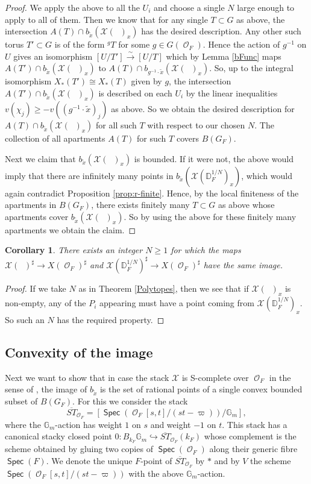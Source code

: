 \documentclass{article}
\DeclareMathOperator{\CO}{\mathcal{O}}
\def\isoto{\stackrel{\sim}{\longrightarrow}}
\DeclareMathOperator{\Spec}{\mathsf{Spec}}
\newcommand{\BG}{{\mathbb{G}}}
\newcommand{\CX}{{\mathcal X}}
\newcommand{\Dr}[1][r]{\mathbb{D}_F^{1/#1}}
\DeclareMathOperator{\Dinfty}{\mathbb{D}_F^{1/\infty}}
\let\into\hookrightarrow
\theoremstyle{definition}
\theoremstyle{plain}
\newtheorem{corollary}[definition]{Corollary}
\begin{document}
\begin{proof}
    We apply the above to all the $U_i$ and choose a single $N$ large enough to apply to all of them. Then we know that for any single $T \subset G$ as above, the intersection $A(T) \cap b_{\tilde x}(\CX(\Dinfty)_x)$ has the desired description. Any other such torus $T' \subset G$ is of the form $^{g}T$ for some $g \in G(\CO_F)$. Hence the action of $g^{-1}$ on $U$ gives an isomorphism $[U/T'] \isoto [U/T]$ which by Lemma \ref{bFunc} maps $A(T') \cap b_{\tilde x}(\CX(\Dinfty)_x)$ to $A(T) \cap b_{g^{-1}\cdot \tilde x}(\CX(\Dinfty)_x)$. So, up to the integral isomorphism $X_*(T') \cong X_*(T)$ given by $g$, the intersection $A(T') \cap b_{\tilde x}(\CX(\Dinfty)_x)$ is described on each $U_i$ by the linear inequalities $v(\chi_j) \geq -v((g^{-1}\cdot \tilde x)_j)$ as above. So we obtain the desired description for $A(T) \cap b_{\tilde x}(\CX(\Dinfty)_x)$ for all such $T$ with respect to our chosen $N$. The collection of all apartments $A(T)$ for such $T$ covers $B(G_F)$. 

    Next we claim that $b_{\tilde x}(\CX(\Dinfty)_x)$ is bounded. If it were not, the above would imply that there are infinitely many points in $b_{\tilde x}(\CX(\Dr[N])_x)$, which would again contradict Proposition \ref{prop:r-finite}. Hence, by the local finiteness of the apartments in $B(G_F)$, there exists finitely many $T \subset G$ as above whose apartments cover $b_{\tilde x}(\CX(\Dinfty)_x)$. So by using the above for these finitely many apartments we obtain the claim.
\end{proof}

\begin{corollary} \label{PiImageBounded}
    There exists an integer $N\geq 1$ for which the maps $\CX(\Dinfty)^\sharp \to X(\CO_F)^\sharp$ and $\CX(\Dr[N])^\sharp \to X(\CO_F)^\sharp$ have the same image.
\end{corollary}
\begin{proof}
    If we take $N$ as in Theorem \ref{Polytopes}, then we see that if $\CX(\Dinfty)_x$ is non-empty, any of the $P_i$ appearing must have a point coming from $\CX(\Dr[N])_x$. So such an $N$ has the required property.
\end{proof}

\subsection{Convexity of the image}
Next we want to show that in case the stack $\CX$ is S-complete over $\CO_F$ in the sense of \cite[Definition 3.38]{AHH23}, the image of $b_{\tilde x}$ is the set of rational points of a single convex bounded subset of $B(G_F)$. For this we consider the stack $$\overline{ST}_{\CO_F}=[\Spec(\CO_F[s,t]/(st-\varpi))/\BG_m],$$ where the $\BG_m$-action has weight $1$ on $s$ and weight $-1$ on $t$. This stack has a canonical stacky closed point $0 \colon B_{k_F} \BG_m \into \overline{ST}_{\CO_F}(k_F)$ whose complement is the scheme obtained by gluing two copies of $\Spec(\CO_F)$ along their generic fibre $\Spec(F)$. We denote the unique $F$-point of $\overline{ST}_{\CO_F}$ by $\ast$ and by $V$ the scheme $\Spec(\CO_F[s,t]/(st-\varpi))$ with the above $\BG_m$-action.
\end{document}
